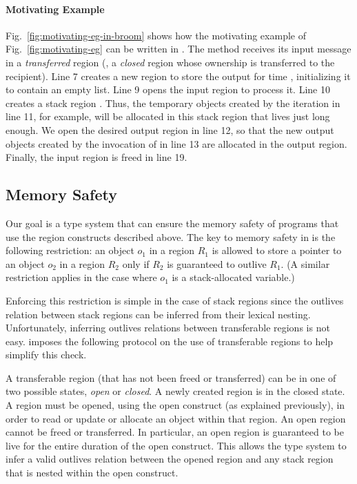\paragraph{Motivating Example}
Fig.~\ref{fig:motivating-eg-in-broom} shows how the motivating example
of Fig.~\ref{fig:motivating-eg} can be written in \name.
The  method receives its input message in a \emph{transferred}
region (\ie, a \emph{closed} region whose ownership is transferred to the
recipient).
Line 7 creates a new region to store the output for time ,
initializing it to contain an empty list.
Line 9 opens the input region to process it.
Line 10 creates a stack region .
Thus, the temporary objects created by the iteration in line 11,
for example, will be allocated in this stack region that lives just
long enough.
We open the desired output region in line 12, so that the new output
objects created by the invocation of  in line 13
are allocated in the output region.
Finally, the input region is freed in line 19.



\subsection{Memory Safety}
\label{sec:memory-safety}

Our goal is a type system that can ensure the memory safety of programs that use the region
constructs described above.
The key to memory safety in \name is the following restriction:
an object $o_1$ in a region $R_1$ is allowed to store a pointer to
an object $o_2$ in a region $R_2$ only if $R_2$ is guaranteed to outlive $R_1$.
(A similar restriction applies in the case where $o_1$ is a stack-allocated variable.)

Enforcing this restriction is simple in the case of stack regions since the outlives relation
between stack regions can be inferred from their lexical nesting. Unfortunately,
inferring outlives relations between transferable regions is not easy.
\name imposes the following protocol on the use of transferable regions to help simplify
this check.

A transferable region (that has not been freed or transferred) can be in one of two possible
states, \emph{open} or \emph{closed}. A newly created region is in the closed state.
A region must be opened, using the open construct (as explained previously), in order
to read or update or allocate an object within that region.
An open region cannot be freed or transferred. 
In particular, an open region is guaranteed to be live for the entire duration of the open construct.
This allows the type system to infer a valid outlives relation between the opened region
and any stack region that is nested within the open construct.

